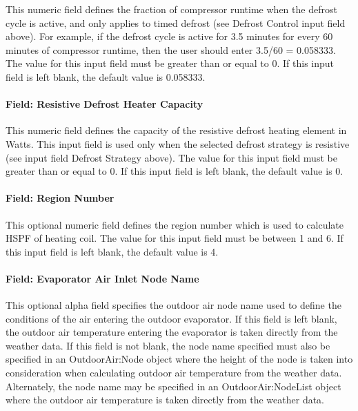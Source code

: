 This numeric field defines the fraction of compressor runtime when the defrost cycle is active, and only applies to timed defrost (see Defrost Control input field above). For example, if the defrost cycle is active for 3.5 minutes for every 60 minutes of compressor runtime, then the user should enter 3.5/60 = 0.058333. The value for this input field must be greater than or equal to 0. If this input field is left blank, the default value is 0.058333.

\paragraph{Field: Resistive Defrost Heater Capacity}\label{field-resistive-defrost-heater-capacity}

This numeric field defines the capacity of the resistive defrost heating element in Watts. This input field is used only when the selected defrost strategy is resistive (see input field Defrost Strategy above). The value for this input field must be greater than or equal to 0. If this input field is left blank, the default value is 0.

\paragraph{Field: Region Number}\label{field-region-number}

This optional numeric field defines the region number which is used to calculate HSPF of heating coil. The value for this input field must be between 1 and 6. If this input field is left blank, the default value is 4.

\paragraph{Field: Evaporator Air Inlet Node Name}\label{field-evaporator-air-inlet-node-name}

This optional alpha field specifies the outdoor air node name used to define the conditions of the air entering the outdoor evaporator. If this field is left blank, the outdoor air temperature entering the evaporator is taken directly from the weather data. If this field is not blank, the node name specified must also be specified in an OutdoorAir:Node object where the height of the node is taken into consideration when calculating outdoor air temperature from the weather data. Alternately, the node name may be specified in an OutdoorAir:NodeList object where the outdoor air temperature is taken directly from the weather data.


